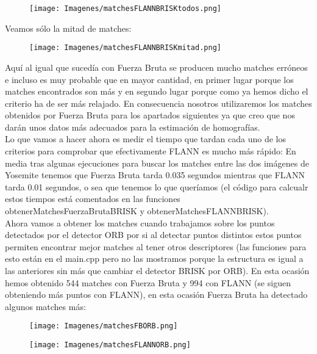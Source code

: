 \documentclass[10pt,a4paper]{article}
\begin{document}
\begin{figure}[H]
\centering
\texttt{[image: Imagenes/matchesFLANNBRISKtodos.png]}
\end{figure}

Veamos sólo la mitad de matches:\\

\begin{figure}[H]
\centering
\texttt{[image: Imagenes/matchesFLANNBRISKmitad.png]}
\end{figure}

Aquí al igual que sucedía con Fuerza Bruta se producen mucho matches erróneos e incluso es muy probable que en mayor cantidad, en primer lugar porque los matches encontrados son más y en segundo lugar porque como ya hemos dicho el criterio ha de ser más relajado. En consecuencia nosotros utilizaremos los matches obtenidos por Fuerza Bruta para los apartados siguientes ya que creo que nos darán unos datos más adecuados para la estimación de homografías.\\

Lo que vamos a hacer ahora es medir el tiempo que tardan cada uno de los criterios para comprobar que efectivamente FLANN es mucho más rápido: En media tras algunas ejecuciones para buscar los matches entre las dos imágenes de Yosemite tenemos que Fuerza Bruta tarda 0.035 segundos mientras que FLANN tarda 0.01 segundos, o sea que tenemos lo que queríamos (el código para calcualr estos tiempos está comentados en las funciones obtenerMatchesFuerzaBrutaBRISK y obtenerMatchesFLANNBRISK).\\

Ahora vamos a obtener los matches cuando trabajamos sobre los puntos detectados por el detector ORB por si al detectar puntos distintos estos puntos permiten encontrar mejor matches al tener otros descriptores (las funciones para esto están en el main.cpp pero no las mostramos porque la estructura es igual a las anteriores sin más que cambiar el detector BRISK por ORB). En esta ocasión hemos obtenido 544 matches con Fuerza Bruta y 994 con FLANN (se siguen obteniendo más puntos con FLANN), en esta ocasión Fuerza Bruta ha detectado algunos matches más:\\

\begin{figure}[H]
\centering
\texttt{[image: Imagenes/matchesFBORB.png]}
\end{figure}

\begin{figure}[H]
\centering
\texttt{[image: Imagenes/matchesFLANNORB.png]}
\end{figure}
\end{document}
